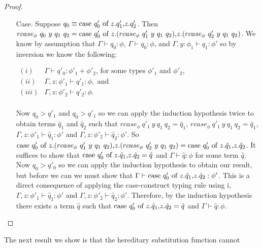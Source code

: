 \begin{proof}
\begin{itemize}
\begin{itemize}
\begin{itemize}
    \item[Case.] Suppose $q_0 \equiv \mbox{case}\ q'_0\ \text{of}\ z\text{.}q'_1\text{,}z\text{.}q'_2$.  Then \\
      $rcase_{\phi}\ q_0\ y\ q_1\ q_2 = \ccon{q'_0}{z}{(rcase_{\phi}\ q'_1\ y\ q_1\ q_2)}{(rcase_{\phi}\ q'_2\ y\ q_1\ q_2)}$.
      We know by assumption that $\Gamma \vdash q_0:\phi$, $\Gamma \vdash q_0:\phi$, and $\Gamma, y:\phi_1 \vdash q_1:\phi'$
      so by inversion we know the following:
      \begin{center}
        \begin{math}
          \begin{array}{lll}
            (i) & \Gamma \vdash q'_0:\phi'_1 + \phi'_2 \text{, for some types } \phi'_1 \text{ and } \phi'_2,\\
            (ii) & \Gamma, z:\phi'_1 \vdash q'_1:\phi, \text{ and }\\
            (iii) & \Gamma, z:\phi'_2 \vdash q'_2:\phi.\\
          \end{array}
        \end{math}
      \end{center}
      Now $q_0 > q'_1$ and $q_0 > q'_1$ so we can apply the induction hypothesis twice to obtain terms $\hat{q}_1$ and
      $\hat{q}_2$ such that $rcase_{\phi}\ q'_1\ y\ q_1\ q_2 = \hat{q}_1$, $rcase_{\phi}\ q'_1\ y\ q_1\ q_2 = \hat{q}_1$,
      $\Gamma, z:\phi'_1 \vdash \hat{q}_1:\phi'$ and $\Gamma, z:\phi'_2 \vdash \hat{q}_2:\phi'$. So
      $\ccon{q'_0}{z}{(rcase_{\phi}\ q'_1\ y\ q_1\ q_2)}{(rcase_{\phi}\ q'_2\ y\ q_1\ q_2)} = 
      \ccon{q'_0}{z}{\hat{q}_1}{\hat{q}_2}$.  It suffices to show that $\mbox{case}\ q'_0\ \text{of}\ z\text{.}\hat{q}_1\text{,}z\text{.}\hat{q}_2 = \hat{q}$ 
      and $\Gamma \vdash \hat{q}:\phi$ for some term $\hat{q}$.  Now $q_0 > q'_0$ so we can apply the induction hypothesis
      to obtain our result, but before we can we must show that $\Gamma \vdash \mbox{case}\ q'_0\ \text{of}\ z\text{.}\hat{q}_1\text{,}z\text{.}\hat{q}_2:\phi'$.
      This is a direct consequence of applying the case-construct typing rule using i, $\Gamma, z:\phi'_1 \vdash \hat{q}_1:\phi'$
      and $\Gamma, z:\phi'_2 \vdash \hat{q}_2:\phi'$.  Therefore, by the induction hypothesis there exists a term $\hat{q}$ 
      such that $\mbox{case}\ q'_0\ \text{of}\ z\text{.}\hat{q}_1\text{,}z\text{.}\hat{q}_2 = \hat{q}$ and $\Gamma \vdash \hat{q}:\phi$.
    \end{itemize}
  \end{itemize}
\end{itemize}
\end{proof}
The next result we show is that the hereditary substitution function cannot 
